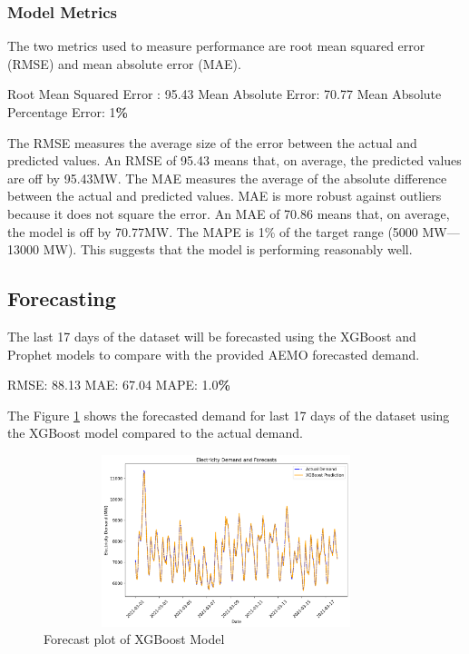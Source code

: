 \documentclass[mstat,12pt]{unswthesis}
\newenvironment{Shaded}{\begin{snugshade}}{\end{snugshade}}
\newcommand{\DecValTok}[1]{\textcolor[rgb]{0.00,0.00,0.81}{#1}}
\newcommand{\FloatTok}[1]{\textcolor[rgb]{0.00,0.00,0.81}{#1}}
\newcommand{\NormalTok}[1]{#1}
\newcommand{\OperatorTok}[1]{\textcolor[rgb]{0.81,0.36,0.00}{\textbf{#1}}}
\begin{document}
\subsubsection{Model Metrics}\label{model-metrics}

The two metrics used to measure performance are root mean squared error
(RMSE) and mean absolute error (MAE).

\begin{Shaded}
\begin{Highlighting}[]
\NormalTok{Root Mean Squared Error : }\FloatTok{95.43}
\NormalTok{Mean Absolute Error: }\FloatTok{70.77}
\NormalTok{Mean Absolute Percentage Error: }\DecValTok{1}\OperatorTok{\%}
\end{Highlighting}
\end{Shaded}

The RMSE measures the average size of the error between the actual and
predicted values. An RMSE of 95.43 means that, on average, the predicted
values are off by 95.43MW. The MAE measures the average of the absolute
difference between the actual and predicted values. MAE is more robust
against outliers because it does not square the error. An MAE of 70.86
means that, on average, the model is off by 70.77MW. The MAPE is 1\% of
the target range (5000 MW---13000 MW). This suggests that the model is
performing reasonably well.

\subsection{Forecasting}\label{forecasting}

The last 17 days of the dataset will be forecasted using the XGBoost and
Prophet models to compare with the provided AEMO forecasted demand.

\begin{Shaded}
\begin{Highlighting}[]
\NormalTok{RMSE: }\FloatTok{88.13}
\NormalTok{MAE: }\FloatTok{67.04}
\NormalTok{MAPE: }\FloatTok{1.0}\OperatorTok{\%}
\end{Highlighting}
\end{Shaded}

The Figure \ref{xgboost_prediction} shows the forecasted demand for last
17 days of the dataset using the XGBoost model compared to the actual
demand.

\begin{figure}[H]
\centering
\includegraphics[width=0.95\textwidth, height=5cm]{xgboost_prediction.png}
\caption{Forecast plot of XGBoost Model}\label{xgboost_prediction}
\end{figure}
\end{document}
